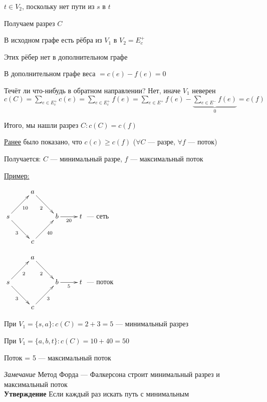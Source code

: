 \documentclass[a4paper, 12pt] {article}
\begin{document}
$ t \in V_{2} $, поскольку нет пути из $ s $ в $ t $

Получаем разрез $ C $

В исходном графе есть рёбра из $ V_{1} $ в $ V_{2} = E_{c}^{+}$

Этих рёбер нет в дополнительном графе

В дополнительном графе веса $ = c(e) - f(e) =0 $

Течёт ли что-нибудь в обратном направлении? Нет, иначе $ V_{1} $ неверен\\

$ c(C) = \sum\limits_{e \in E_{c}^{+}} c(e) = \sum\limits_{e \in E_{c}^{+}} f(e) = \sum\limits_{e \in E^{+}} f(e) - \underbrace{\sum\limits_{e \in E^{-}} f(e)}_{0} = c(f)$

Итого, мы нашли разрез $ C: c(C)=c(f)$ 

\hyperlink{link2}{Ранее} было показано, что $ c(c) \ge c(f) $ 
($ \forall C $ --- разре, $ \forall f$ --- поток)

Получается: $ C $ --- минимальный разре, $  f$ --- максимальный поток

\underline{Пример:}

$\begin{matrix}
	\xymatrix{
		& a \ar@{->}[rd]_2 \\
		s \ar@{->}[rd]_3 \ar@{->}[ru]_{10} & & b \ar@{->}[r]_{20} & t \\
			& c \ar@{->}[ru]_{40} \\
	}
\end{matrix}$ --- сеть

$\begin{matrix}
	\xymatrix{
		& a \ar@{->}[rd]_2 \\
		s \ar@{->}[rd]_3 \ar@{->}[ru]_{2} & & b \ar@{->}[r]_{5} & t \\
		& c \ar@{->}[ru]_{3} \\
	}
\end{matrix}$ --- поток

\newpage

При $ V_{1} = \{s, a\}: c(C) = 2+3=5 $ --- минимальный разрез

При $ V_{1} = \{a, b, t\}: c(C) = 10+40=50 $

Поток = 5 --- максимальный поток

\textit{Замечание} Метод Форда — Фалкерсона строит минимальный разрез и максимальный поток\\

\textbf{Утверждение} Если каждый раз искать путь с минимальным
\end{document}
